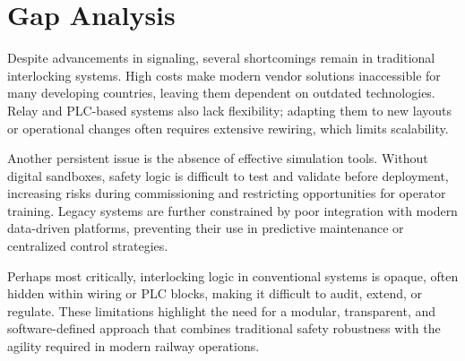 \section{Gap Analysis}
Despite advancements in signaling, several shortcomings remain in traditional interlocking systems. High costs make modern vendor solutions inaccessible for many developing countries, leaving them dependent on outdated technologies. Relay and PLC-based systems also lack flexibility; adapting them to new layouts or operational changes often requires extensive rewiring, which limits scalability.

Another persistent issue is the absence of effective simulation tools. Without digital sandboxes, safety logic is difficult to test and validate before deployment, increasing risks during commissioning and restricting opportunities for operator training. Legacy systems are further constrained by poor integration with modern data-driven platforms, preventing their use in predictive maintenance or centralized control strategies.

Perhaps most critically, interlocking logic in conventional systems is opaque, often hidden within wiring or PLC blocks, making it difficult to audit, extend, or regulate. These limitations highlight the need for a modular, transparent, and software-defined approach that combines traditional safety robustness with the agility required in modern railway operations.
